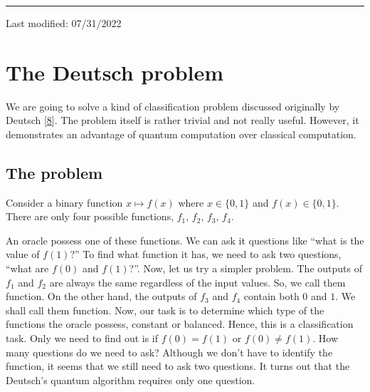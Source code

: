 \documentclass[letterpaper,10pt,english]{jupyterBook}
\begin{document}
\bigskip\hrule\bigskip


\sphinxAtStartPar
Last modified: 07/31/2022

\sphinxstepscope


\section{The Deutsch problem}
\label{\detokenize{algorithms/deutsch:the-deutsch-problem}}\label{\detokenize{algorithms/deutsch:sec-deustch}}\label{\detokenize{algorithms/deutsch::doc}}
\sphinxAtStartPar
We are going to solve a kind of classification problem discussed originally by Deutsch {[}\hyperlink{cite.references:id17}{8}{]}.   The problem itself is rather trivial and not really useful. However, it demonstrates an advantage of quantum computation over classical computation.


\subsection{The problem}
\label{\detokenize{algorithms/deutsch:the-problem}}
\sphinxAtStartPar
Consider a binary function \(x \mapsto f(x)\) where \(x \in \{0,1\}\) and \(f(x)  \in \{0,1\}\). There are only four possible functions, \(f_1,\, f_2,\, f_3,\, f_4\).



\sphinxAtStartPar
An oracle possess one of these functions.  We can ask it questions like “what is the value of \(f(1)\)?”  To find what function it has, we need to ask two questions, “what are \(f(0)\) and \(f(1)\)?”.  Now, let us try a simpler problem.  The outputs of \(f_1\) and \(f_2\) are always the same regardless of the input values.  So, we call them  function.  On the other hand, the outputs of \(f_3\) and \(f_4\) contain both \(0\) and \(1\).  We shall call them  function.  Now, our task is to determine which type of the functions the oracle possess, constant or balanced. Hence, this is a classification task. Only we need to find out is if \(f(0)=f(1)\) or \(f(0)\ne f(1)\).  How many questions do we need to ask?  Although we don’t have to identify the function, it seems that we still need to ask two questions. It turns out that the Deutsch’s quantum algorithm requires only one question.
\end{document}

